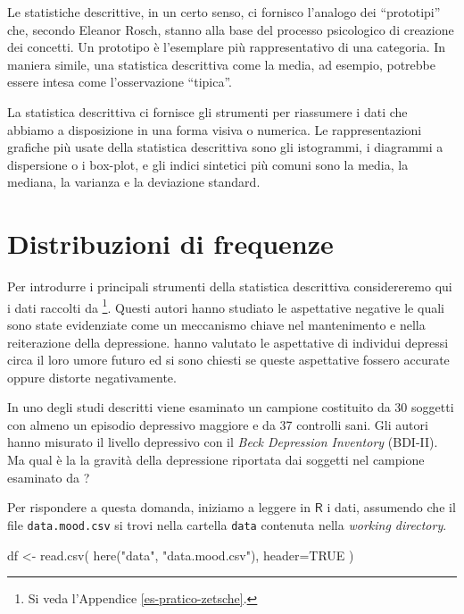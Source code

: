 \documentclass[
  11pt,
  italian,
  a4paper,
  extrafontsizes,onecolumn,openright
  ]{memoir}
\newenvironment{Shaded}{\begin{snugshade}}{\end{snugshade}}
\newcommand{\AttributeTok}[1]{\textcolor[rgb]{0.77,0.63,0.00}{#1}}
\newcommand{\ConstantTok}[1]{\textcolor[rgb]{0.00,0.00,0.00}{#1}}
\newcommand{\FunctionTok}[1]{\textcolor[rgb]{0.00,0.00,0.00}{#1}}
\newcommand{\NormalTok}[1]{#1}
\newcommand{\OtherTok}[1]{\textcolor[rgb]{0.56,0.35,0.01}{#1}}
\newcommand{\StringTok}[1]{\textcolor[rgb]{0.31,0.60,0.02}{#1}}
\newcommand{\R}{\textsf{R}} %
\theoremstyle{definition}
\theoremstyle{definition}
\theoremstyle{definition}
\theoremstyle{definition}
\theoremstyle{remark}
\begin{document}
Le statistiche descrittive, in un certo senso, ci fornisco l'analogo dei
``prototipi'' che, secondo Eleanor Rosch, stanno alla base del processo
psicologico di creazione dei concetti. Un prototipo è l'esemplare più
rappresentativo di una categoria. In maniera simile, una statistica
descrittiva come la media, ad esempio, potrebbe essere intesa come
l'osservazione ``tipica''.

La statistica descrittiva ci fornisce gli strumenti per riassumere i
dati che abbiamo a disposizione in una forma visiva o numerica. Le
rappresentazioni grafiche più usate della statistica descrittiva sono
gli istogrammi, i diagrammi a dispersione o i box-plot, e gli indici
sintetici più comuni sono la media, la mediana, la varianza e la
deviazione standard.

\hypertarget{distribuzioni-di-frequenze}{%
\section{Distribuzioni di frequenze}\label{distribuzioni-di-frequenze}}

Per introdurre i principali strumenti della statistica descrittiva considereremo qui i dati raccolti da \textcite{zetschefuture2019}\footnote{Si veda l'Appendice \ref{es-pratico-zetsche}.}. Questi autori hanno studiato le aspettative negative le quali sono state evidenziate come un meccanismo chiave nel mantenimento e nella reiterazione della depressione. \textcite{zetschefuture2019} hanno valutato le aspettative di individui depressi circa il loro umore futuro ed si sono chiesti se queste aspettative fossero accurate oppure distorte negativamente.

In uno degli studi descritti viene esaminato un campione costituito da 30 soggetti con almeno un episodio depressivo maggiore e da 37 controlli sani. Gli autori hanno misurato il livello depressivo con il \emph{Beck Depression Inventory} (BDI-II). Ma qual è la la gravità della depressione riportata dai soggetti nel campione esaminato da \textcite{zetschefuture2019}?

Per rispondere a questa domanda, iniziamo a leggere in \(\R\) i dati, assumendo che il file \texttt{data.mood.csv} si trovi nella cartella \texttt{data} contenuta nella \emph{working directory}.

\begin{Shaded}
\begin{Highlighting}[]
\NormalTok{df }\OtherTok{\textless{}{-}} \FunctionTok{read.csv}\NormalTok{(}
  \FunctionTok{here}\NormalTok{(}\StringTok{"data"}\NormalTok{, }\StringTok{"data.mood.csv"}\NormalTok{), }
  \AttributeTok{header=}\ConstantTok{TRUE}
\NormalTok{) }
\end{Highlighting}
\end{Shaded}
\end{document}
